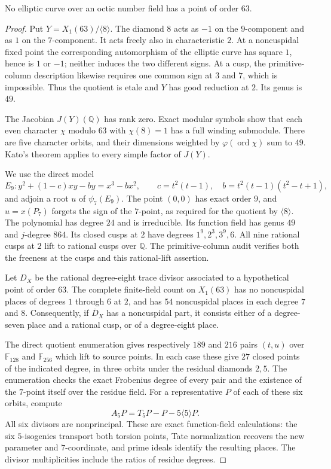 \begin{proposition}\label{prop:octic63}
No elliptic curve over an octic number field has a point of order $63$.
\end{proposition}
\begin{proof}
Put $Y=X_1(63)/\langle8\rangle$. The diamond $8$ acts as $-1$ on the
$9$-component and as $1$ on the $7$-component. It acts freely also in
characteristic $2$. At a noncuspidal fixed point the corresponding
automorphism of the elliptic curve has square $1$, hence is $1$ or $-1$;
neither induces the two different signs. At a cusp, the primitive-column
description likewise requires one common sign at $3$ and $7$, which is
impossible. Thus the quotient is etale and $Y$ has good reduction at $2$.
Its genus is $49$.

The Jacobian $J(Y)(\mathbb Q)$ has rank zero. Exact modular symbols
show that each even character $\chi$ modulo $63$ with $\chi(8)=1$
has a full winding submodule. There are five character orbits, and
their dimensions weighted by $\varphi(\operatorname{ord}\chi)$ sum
to $49$. Kato's theorem applies to every simple factor of $J(Y)$.

We use the direct model
\[
 E_9:y^2+(1-c)xy-by=x^3-bx^2,\qquad
 c=t^2(t-1),\quad b=t^2(t-1)(t^2-t+1),
\]
and adjoin a root $u$ of $\psi_7(E_9)$. The point $(0,0)$ has exact
order $9$, and $u=x(P_7)$ forgets the sign of the $7$-point, as required
for the quotient by $\langle8\rangle$. The polynomial has degree $24$
and is irreducible. Its function field has genus $49$ and $j$-degree
$864$. Its closed cusps at $2$ have degrees $1^9,2^3,3^9,6$.
All nine rational cusps at $2$ lift to rational cusps over $\mathbb Q$.
The primitive-column audit verifies both the freeness at the cusps
and this rational-lift assertion.

Let $D_X$ be the rational degree-eight trace divisor associated to
a hypothetical point of order $63$. The complete finite-field count
on $X_1(63)$ has no noncuspidal places of degrees $1$ through $6$ at
$2$, and has $54$ noncuspidal places in each degree $7$ and $8$.
Consequently, if $\overline D_X$ has a noncuspidal part, it consists
either of a degree-seven place and a rational cusp, or of a degree-eight
place.

The direct quotient enumeration gives respectively $189$ and $216$
pairs $(t,u)$ over $\mathbb F_{128}$ and $\mathbb F_{256}$ which lift
to source points. In each case these give $27$ closed points of the
indicated degree, in three orbits under the residual diamonds $2,5$.
The enumeration checks the exact Frobenius degree of every pair and
the existence of the $7$-point itself over the residue field.
For a representative $P$ of each of these six orbits, compute
\[
 A_5P=T_5P-P-5\langle5\rangle P.
\]
All six divisors are nonprincipal. These are exact function-field
calculations: the six $5$-isogenies transport both torsion points,
Tate normalization recovers the new parameter and $7$-coordinate,
and prime ideals identify the resulting places. The divisor
multiplicities include the ratios of residue degrees.


\end{proof}
